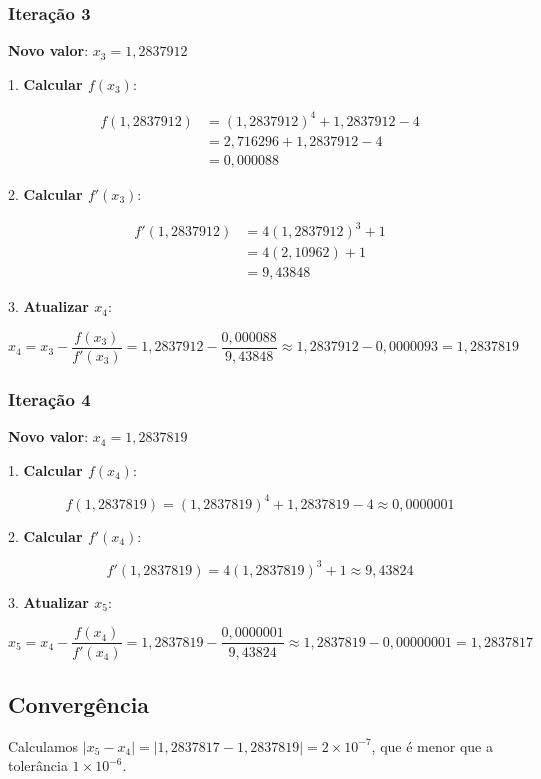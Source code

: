 \documentclass{article}
\begin{document}
\subsubsection*{Iteração 3}

\textbf{Novo valor}: \( x_3 = 1{,}2837912 \)

1. \textbf{Calcular \( f(x_3) \)}:

\[
\begin{aligned}
f(1{,}2837912) &= (1{,}2837912)^4 + 1{,}2837912 - 4 \\
&= 2{,}716296 + 1{,}2837912 - 4 \\
&= 0{,}000088
\end{aligned}
\]

2. \textbf{Calcular \( f'(x_3) \)}:

\[
\begin{aligned}
f'(1{,}2837912) &= 4(1{,}2837912)^3 + 1 \\
&= 4(2{,}10962) + 1 \\
&= 9{,}43848
\end{aligned}
\]

3. \textbf{Atualizar \( x_4 \)}:

\[
x_4 = x_3 - \frac{f(x_3)}{f'(x_3)} = 1{,}2837912 - \frac{0{,}000088}{9{,}43848} \approx 1{,}2837912 - 0{,}0000093 = 1{,}2837819
\]

\subsubsection*{Iteração 4}

\textbf{Novo valor}: \( x_4 = 1{,}2837819 \)

1. \textbf{Calcular \( f(x_4) \)}:

\[
f(1{,}2837819) = (1{,}2837819)^4 + 1{,}2837819 - 4 \approx 0{,}0000001
\]

2. \textbf{Calcular \( f'(x_4) \)}:

\[
f'(1{,}2837819) = 4(1{,}2837819)^3 + 1 \approx 9{,}43824
\]

3. \textbf{Atualizar \( x_5 \)}:

\[
x_5 = x_4 - \frac{f(x_4)}{f'(x_4)} = 1{,}2837819 - \frac{0{,}0000001}{9{,}43824} \approx 1{,}2837819 - 0{,}00000001 = 1{,}2837817
\]

\subsection*{Convergência}

Calculamos \( |x_5 - x_4| = |1{,}2837817 - 1{,}2837819| = 2 \times 10^{-7} \), que é menor que a tolerância \( 1 \times 10^{-6} \).
\end{document}
